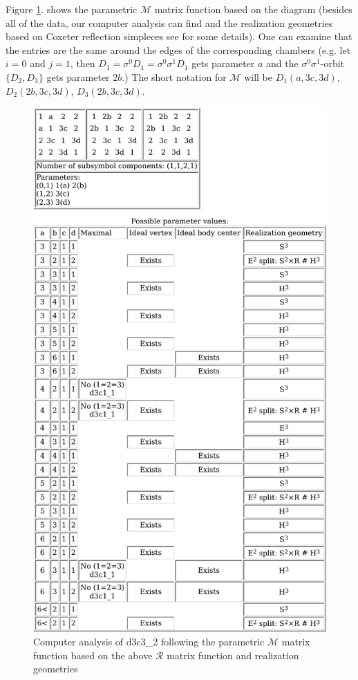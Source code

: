 \documentclass[12pt,a4paper]{article}
\numberwithin{equation}{section}
\theoremstyle{plain}%
\theoremstyle{definition}
\theoremstyle{remark}
\begin{document}
Figure \ref{fig:d3c3_2_pm}. shows the parametric $\mathcal{M}$ matrix function
based on the diagram (besides all of the data, our computer analysis can find
and the realization geometries based on Coxeter reflection simpleces see
\cite{M96} for some details). 
One can examine that the entries are the same around the
edges of the corresponding chambers (e.g. let $i=0$ and $j=1$, then
$D_1=\sigma^0D_1=\sigma^0\sigma^1D_1$ gets parameter $a$ and the
$\sigma^0\sigma^1$-orbit $\{D_2,D_3\}$ gets parameter $2b$.) The short notation
for $\mathcal{M}$ will be $D_1(a,3c,3d)$, $D_2(2b,3c,3d)$, $D_3(2b,3c,3d)$. 

\begin{figure}
  \caption{\label{fig:d3c3_2_pm} Computer analysis of d3c3\_2 following the parametric
  $\mathcal{M}$ matrix function based on the above $\mathcal{R}$ matrix
  function and realization geometries}
  \includegraphics[width=\textwidth,height=0.9\textheight,keepaspectratio]{d3c3_2_analysis.pdf}

\end{figure}
\end{document}

